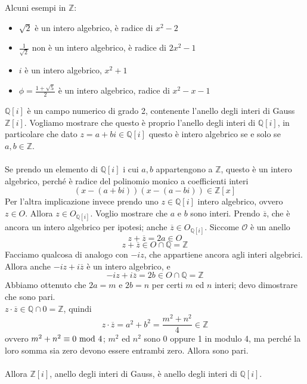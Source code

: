 \begin{esempio}
	Alcuni esempi in $\mathbb{Z}$:
	\begin{itemize}
		\item $\sqrt{2}$ è un intero algebrico, è radice di $x^2-2$
		\item $\frac{1}{\sqrt{2}}$ non è un intero algebrico, è radice di $2x^2-1$
		\item $i$ è un intero algebrico, $x^2+1$
		\item $\phi=\frac{1+\sqrt{5}}{2}$ è un intero algebrico, radice di $x^2-x-1$
	\end{itemize}
\end{esempio}
\begin{esempio}
	$\mathbb{Q}[i]$ è un campo numerico di grado 2, contenente l'anello degli interi di Gauss $\mathbb{Z}[i]$. Vogliamo mostrare che questo è proprio l'anello degli interi di $\mathbb{Q}[i]$, in particolare che dato $z=a+bi\in\mathbb{Q}[i]$ questo è intero algebrico se e solo se $a,b\in\mathbb{Z}$. \\ \\
	Se prendo un elemento di $\mathbb{Q}[i]$ i cui $a,b$ appartengono a $\mathbb{Z}$, questo è un intero algebrico, perché è radice del polinomio monico a coefficienti interi
	\begin{equation*}
	\left(x-(a+bi)\right)\left(x-(a-bi)\right)\in\mathbb{Z}[x]
	\end{equation*}
	Per l'altra implicazione invece prendo uno $z\in\mathbb{Q}[i]$ intero algebrico, ovvero $z\in O$. Allora $z\in O_{\mathbb{Q}[i]}$. Voglio mostrare che $a$ e $b$ sono interi. Prendo $\overline{z}$, che è ancora un intero algebrico per ipotesi; anche $\overline{z}\in O_{\mathbb{Q}[i]}$. Siccome $\mathcal{O}$ è un anello
	\begin{equation*}
	z+\overline{z}=2a\in O
	\end{equation*}
	\begin{equation*}
	z+\overline{z}\in O \cap \mathbb{Q} = \mathbb{Z}
	\end{equation*}
	Facciamo qualcosa di analogo con $-iz$, che appartiene ancora agli interi algebrici. Allora anche $-iz+i\overline{z}$ è un intero algebrico, e 
	\begin{equation*}
	-iz+i\overline{z}=2b \in O\cap\mathbb{Q}=\mathbb{Z}
	\end{equation*}
	Abbiamo ottenuto che $2a=m$ e $2b=n$ per certi $m$ ed $n$ interi; devo dimostrare che sono pari. \\ $z\cdot\overline{z}\in\mathbb{Q}\cap 0 =\mathbb{Z}$, quindi
	\begin{equation*}
	z\cdot\overline{z}=a^2+b^2=\frac{m^2+n^2}{4}\in\mathbb{Z}
	\end{equation*}
	ovvero $m^2+n^2\equiv0\ \mathrm{mod}\ 4$; $m^2$ ed $n^2$ sono 0 oppure 1 in modulo 4, ma perché la loro somma sia zero devono essere entrambi zero. Allora sono pari. \\ \\ Allora $\mathbb{Z}[i]$, anello degli interi di Gauss, è anello degli interi di $\mathbb{Q}[i]$.
\end{esempio}
